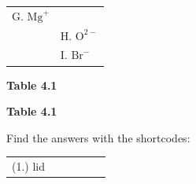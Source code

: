 \begin{table}[H]
\begin{center}
\begin{xtabular}[t]{|l|l|}
        G. ${\mathrm{Mg}}^{+}$%
     \tabularnewline{}
         &
        H. ${\mathrm{O}}^{2-}$%
     \tabularnewline{}
         &
        I. ${\mathrm{Br}}^{-}$%
     \tabularnewline{}
    \end{xtabular}
      \end{center}
    \begin{center}{\small\bfseries Table 4.1}\end{center}
    \begin{caption}{\small\bfseries Table 4.1}\end{caption}
\end{table}
    \par
\par 
      \label{m38757*uid132}
\par {} Find the answers with the shortcodes:
 \par \begin{tabular}[h]{cccccc}
 (1.) lid  & \end{tabular}
